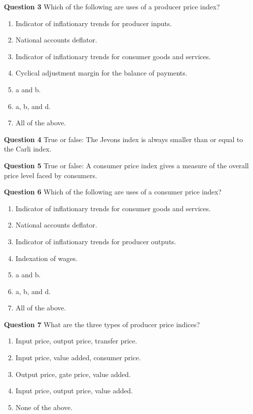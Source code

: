 \documentclass[]{article}
\begin{document}
\textbf{Question 3} Which of the following are uses of a producer price index?

\begin{enumerate}
\def\labelenumi{\alph{enumi})}
\item
  Indicator of inflationary trends for producer inputs.
\item
  National accounts deflator.
\item
  Indicator of inflationary trends for consumer goods and services.
\item
  Cyclical adjustment margin for the balance of payments.
\item
  a and b.
\item
  a, b, and d.
\item
  All of the above.
\end{enumerate}

\textbf{Question 4} True or false: The Jevons index is always smaller than or equal to the Carli index.

\textbf{Question 5} True or false: A consumer price index gives a measure of the overall price level faced by consumers.

\textbf{Question 6} Which of the following are uses of a consumer price index?

\begin{enumerate}
\def\labelenumi{\alph{enumi})}
\item
  Indicator of inflationary trends for consumer goods and services.
\item
  National accounts deflator.
\item
  Indicator of inflationary trends for producer outputs.
\item
  Indexation of wages.
\item
  a and b.
\item
  a, b, and d.
\item
  All of the above.
\end{enumerate}

\textbf{Question 7} What are the three types of producer price indices?

\begin{enumerate}
\def\labelenumi{\alph{enumi})}
\item
  Input price, output price, transfer price.
\item
  Input price, value added, consumer price.
\item
  Output price, gate price, value added.
\item
  Input price, output price, value added.
\item
  None of the above.
\end{enumerate}
\end{document}
